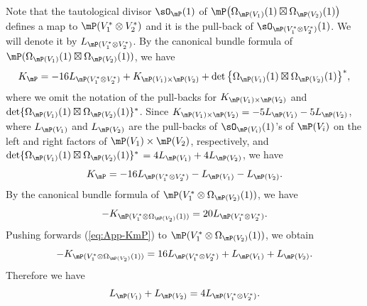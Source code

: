 \documentclass[10pt,a4paper]{amsart}
\numberwithin{equation}{section}
\begin{document}
Note that the tautological divisor $\sO_{\mP}(1)$ of $\mP\big(\Omega_{\mP(V_{1})}(1)\boxtimes\Omega_{\mP(V_{2})}(1)\big)$ defines a map to $\mP(V_{1}^{*}\otimes V_{2}^{*})$ and it is the pull-back of $\sO_{\mP(V_{1}^{*}\otimes V_{2}^{*})}(1)$. We will denote it by $L_{\mP(V_{1}^{*}\otimes V_{2}^{*})}$. By the canonical bundle formula of $\mP(\Omega_{\mP(V_{1})}(1)\boxtimes\Omega_{\mP(V_{2})}(1))$, we have
\begin{gather*}
K_{\mP}=-16L_{\mP(V_{1}^{*}\otimes V_{2}^{*})}+K_{\mP(V_{1})\times\mP(V_{2})}+\det\big\{\Omega_{\mP(V_{1})}(1)\boxtimes\Omega_{\mP(V_{2})}(1)\big\}^{*},
\end{gather*}
where we omit the notation of the pull-backs for $K_{\mP(V_{1})\times\mP(V_{2})}$ and $\det\{\Omega_{\mP(V_{1})}(1)\boxtimes\Omega_{\mP(V_{2})}(1)\}^{*}$. Since $K_{\mP(V_{1})\times\mP(V_{2})}=-5L_{\mP(V_{1})}-5L_{\mP(V_{2})}$, where $L_{\mP(V_{1})}$ and $L_{\mP(V_{2})}$ are the pull-backs of $\sO_{\mP(V_{i})}(1)$'s of $\mP(V_{i})$ on the left and right factors of $\mP(V_{1})\times\mP(V_{2})$, respectively, and $\det\{\Omega_{\mP(V_{1})}(1)\boxtimes\Omega_{\mP(V_{2})}(1)\}^{*}$ $=4L_{\mP(V_{1})}+4L_{\mP(V_{2})}$, we have
\begin{gather}
K_{\mP}=-16L_{\mP(V_{1}^{*}\otimes V_{2}^{*})}-L_{\mP(V_{1})}-L_{\mP(V_{2})}.\label{eq:App-KmP}
\end{gather}
By the canonical bundle formula of $\mP(V_{1}^{*}\otimes\Omega_{\mP(V_{2})}(1))$, we have
\begin{gather*}
-K_{\mP(V_{1}^{*}\otimes\Omega_{\mP(V_{2})}(1))}=20L_{\mP(V_{1}^{*}\otimes V_{2}^{*})}.
\end{gather*}
Pushing forwards (\ref{eq:App-KmP}) to $\mP(V_{1}^{*}\otimes\Omega_{\mP(V_{2})}(1))$, we obtain
\begin{gather*}
-K_{\mP(V_{1}^{*}\otimes\Omega_{\mP(V_{2})}(1))}=16L_{\mP(V_{1}^{*}\otimes V_{2}^{*})}+L_{\mP(V_{1})}+L_{\mP(V_{2})}.
\end{gather*}
Therefore we have
\begin{gather}
L_{\mP(V_{1})}+L_{\mP(V_{2})}=4L_{\mP(V_{1}^{*}\otimes V_{2}^{*})}.\label{eq:new706}
\end{gather}
\end{document}
